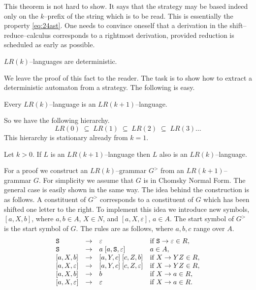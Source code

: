 This theorem is not hard to show. It says that the strategy
may be based indeed only on the $k$--prefix of the string
which is to be read. This is essentially the property \eqref{eq:24ast}.
One needs to convince oneself that a derivation in the
shift--reduce--calculus corresponds to a rightmost derivation,
provided reduction is scheduled as early as possible.
\begin{thm}
\label{thm:det}
$LR(k)$--languages are deterministic.
\end{thm}
We leave the proof of this fact to the reader. The task is
to show how to extract a deterministic automaton from a
strategy. The following is easy.
\begin{lem}
Every $LR(k)$--language is an $LR(k+1)$--language.
\end{lem}
So we have the following hierarchy.
\begin{equation}
LR(0) \;\subseteq\; LR(1) \; \subseteq\; LR(2) \; \subseteq \;
LR(3) \dotso
\end{equation}
This hierarchy is stationary already from $k = 1$.
\begin{lem}
\label{lem:reduktion}
Let $k > 0$. If $L$ is an $LR(k+1)$--language then
$L$ also is an $LR(k)$--language.
\end{lem}
\proofbeg
For a proof we construct an $LR(k)$--grammar $G^>$ from an 
$LR(k+1)$--grammar $G$. For simplicity we assume that $G$ is
in Chomsky Normal Form. The general case is easily shown in the
same way. The idea behind the construction is as follows. A
constituent of $G^>$ corresponds to a constituent of $G$ which 
has been shifted one letter to the right. To implement this idea 
we introduce new symbols, $[a,X,b]$, where $a, b \in A$, $X \in N$, and
$[a,X, \varepsilon]$, $a \in A$. The start symbol of $G^>$ is
the start symbol of $G$. The rules are as follows, where $a, 
b, c$ range over $A$.
\begin{equation}
\begin{array}{l@{\quad\pf \quad}ll}
\mbox{\tt S} & \varepsilon & \mbox{if }
        \mbox{\tt S} \pf \varepsilon \in R, \\
\mbox{\tt S} & a\; [a,\mbox{\tt S},\varepsilon] & a \in A, \\
\mbox{}[a, X, b]    & [a, Y, c]\; [c, Z, b]
    & \mbox{if }X \pf YZ \in R, \\
\mbox{} [a, X, \varepsilon] & [a, Y, c]\; [c, Z, \varepsilon] &
    \mbox{if }X \pf YZ \in R, \\
\mbox{}[a, X, b]    & b   & \mbox{if }X \pf a \in R, \\
\mbox{}[a, X, \varepsilon] & \varepsilon & \mbox{if }X \pf a \in R.
\end{array}
\end{equation}
